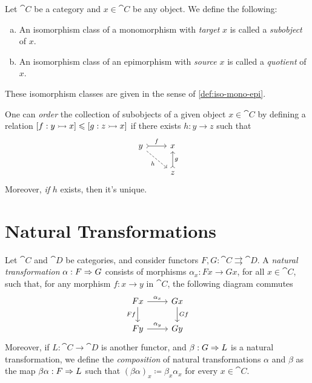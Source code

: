 \begin{definition}
\label{def:subobject-quotient}
Let \(\cat C\) be a category and \(x \in \cat C\) be any object. We define the
following:
\begin{enumerate}[(a)]\setlength\itemsep{0em}
\item An isomorphism class of a monomorphism with \emph{target} \(x\) is called a
  \emph{subobject} of \(x\).
\item An isomorphism class of an epimorphism with \emph{source} \(x\) is called a
  \emph{quotient} of \(x\).
\end{enumerate}
These isomorphism classes are given in the sense of \cref{def:iso-mono-epi}.
\end{definition}

\begin{example}
\label{exp:order-subobject}
One can \emph{order} the collection of subobjects of a given object \(x \in \cat
C\) by defining a relation \([f: y \rightarrowtail x] \leqslant [g: z \rightarrowtail x]\) if there
exists \(h: y \to z\) such that
\[
  \begin{tikzcd}
    y \ar[r, tail, "f"] \ar[rd, dashed, swap, "h"] &x \\
    &z \ar[u, tail, swap, "g"]
  \end{tikzcd}
\]
Moreover, \emph{if} \(h\) exists, then it's unique.
\end{example}


\section{Natural Transformations}

\begin{definition}
\label{def:natural-transformation}
Let \(\cat C\) and \(\cat D\) be categories, and consider functors \(F, G:
\cat C \rightrightarrows \cat D\). A \emph{natural transformation} \(\alpha: F
\Rightarrow G\) consists of morphisms \(\alpha_x: F x \to G x\), for all \(x \in \cat
C\), such that, for any morphism \(f: x \to y\) in \(\cat C\), the following
diagram commutes
\[
  \begin{tikzcd}
    F x \ar[r, "\alpha_x"] \ar[d, swap, "F f"]
    &G x \ar[d, "G f"] \\
    F y \ar[r, "\alpha_y"] &Gy
  \end{tikzcd}
\]
Moreover, if \(L: \cat C \to \cat D\) is another functor, and \(\beta: G \Rightarrow
L\) is a natural transformation, we define the \emph{composition} of natural
transformations \(\alpha\) and \(\beta\) as the map \(\beta \alpha: F \Rightarrow L\)
such that \((\beta \alpha)_x \coloneq \beta_x \alpha_x\) for every \(x \in \cat
C\).
\end{definition}

